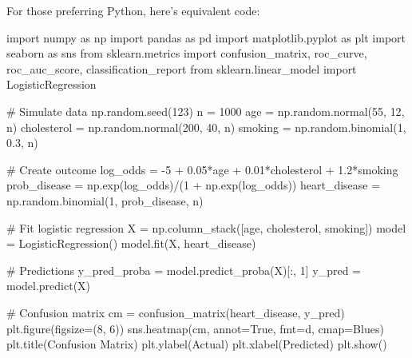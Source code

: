 \documentclass[
  11pt,
  letterpaper,
  oneside]{book}
\newenvironment{Shaded}{\begin{snugshade}}{\end{snugshade}}
\newcommand{\CommentTok}[1]{\textcolor[rgb]{0.37,0.37,0.37}{#1}}
\newcommand{\DecValTok}[1]{\textcolor[rgb]{0.68,0.00,0.00}{#1}}
\newcommand{\FloatTok}[1]{\textcolor[rgb]{0.68,0.00,0.00}{#1}}
\newcommand{\ImportTok}[1]{\textcolor[rgb]{0.00,0.46,0.62}{#1}}
\newcommand{\NormalTok}[1]{\textcolor[rgb]{0.00,0.23,0.31}{#1}}
\newcommand{\OperatorTok}[1]{\textcolor[rgb]{0.37,0.37,0.37}{#1}}
\newcommand{\StringTok}[1]{\textcolor[rgb]{0.13,0.47,0.30}{#1}}
\newcommand{\VariableTok}[1]{\textcolor[rgb]{0.07,0.07,0.07}{#1}}
\begin{document}
For those preferring Python, here's equivalent code:

\begin{Shaded}
\begin{Highlighting}[]
\ImportTok{import}\NormalTok{ numpy }\ImportTok{as}\NormalTok{ np}
\ImportTok{import}\NormalTok{ pandas }\ImportTok{as}\NormalTok{ pd}
\ImportTok{import}\NormalTok{ matplotlib.pyplot }\ImportTok{as}\NormalTok{ plt}
\ImportTok{import}\NormalTok{ seaborn }\ImportTok{as}\NormalTok{ sns}
\ImportTok{from}\NormalTok{ sklearn.metrics }\ImportTok{import}\NormalTok{ confusion\_matrix, roc\_curve, roc\_auc\_score, classification\_report}
\ImportTok{from}\NormalTok{ sklearn.linear\_model }\ImportTok{import}\NormalTok{ LogisticRegression}

\CommentTok{\# Simulate data}
\NormalTok{np.random.seed(}\DecValTok{123}\NormalTok{)}
\NormalTok{n }\OperatorTok{=} \DecValTok{1000}
\NormalTok{age }\OperatorTok{=}\NormalTok{ np.random.normal(}\DecValTok{55}\NormalTok{, }\DecValTok{12}\NormalTok{, n)}
\NormalTok{cholesterol }\OperatorTok{=}\NormalTok{ np.random.normal(}\DecValTok{200}\NormalTok{, }\DecValTok{40}\NormalTok{, n)}
\NormalTok{smoking }\OperatorTok{=}\NormalTok{ np.random.binomial(}\DecValTok{1}\NormalTok{, }\FloatTok{0.3}\NormalTok{, n)}

\CommentTok{\# Create outcome}
\NormalTok{log\_odds }\OperatorTok{=} \OperatorTok{{-}}\DecValTok{5} \OperatorTok{+} \FloatTok{0.05}\OperatorTok{*}\NormalTok{age }\OperatorTok{+} \FloatTok{0.01}\OperatorTok{*}\NormalTok{cholesterol }\OperatorTok{+} \FloatTok{1.2}\OperatorTok{*}\NormalTok{smoking}
\NormalTok{prob\_disease }\OperatorTok{=}\NormalTok{ np.exp(log\_odds)}\OperatorTok{/}\NormalTok{(}\DecValTok{1} \OperatorTok{+}\NormalTok{ np.exp(log\_odds))}
\NormalTok{heart\_disease }\OperatorTok{=}\NormalTok{ np.random.binomial(}\DecValTok{1}\NormalTok{, prob\_disease, n)}

\CommentTok{\# Fit logistic regression}
\NormalTok{X }\OperatorTok{=}\NormalTok{ np.column\_stack([age, cholesterol, smoking])}
\NormalTok{model }\OperatorTok{=}\NormalTok{ LogisticRegression()}
\NormalTok{model.fit(X, heart\_disease)}

\CommentTok{\# Predictions}
\NormalTok{y\_pred\_proba }\OperatorTok{=}\NormalTok{ model.predict\_proba(X)[:, }\DecValTok{1}\NormalTok{]}
\NormalTok{y\_pred }\OperatorTok{=}\NormalTok{ model.predict(X)}

\CommentTok{\# Confusion matrix}
\NormalTok{cm }\OperatorTok{=}\NormalTok{ confusion\_matrix(heart\_disease, y\_pred)}
\NormalTok{plt.figure(figsize}\OperatorTok{=}\NormalTok{(}\DecValTok{8}\NormalTok{, }\DecValTok{6}\NormalTok{))}
\NormalTok{sns.heatmap(cm, annot}\OperatorTok{=}\VariableTok{True}\NormalTok{, fmt}\OperatorTok{=}\StringTok{\textquotesingle{}d\textquotesingle{}}\NormalTok{, cmap}\OperatorTok{=}\StringTok{\textquotesingle{}Blues\textquotesingle{}}\NormalTok{)}
\NormalTok{plt.title(}\StringTok{\textquotesingle{}Confusion Matrix\textquotesingle{}}\NormalTok{)}
\NormalTok{plt.ylabel(}\StringTok{\textquotesingle{}Actual\textquotesingle{}}\NormalTok{)}
\NormalTok{plt.xlabel(}\StringTok{\textquotesingle{}Predicted\textquotesingle{}}\NormalTok{)}
\NormalTok{plt.show()}


\end{Highlighting}
\end{Shaded}
\end{document}
